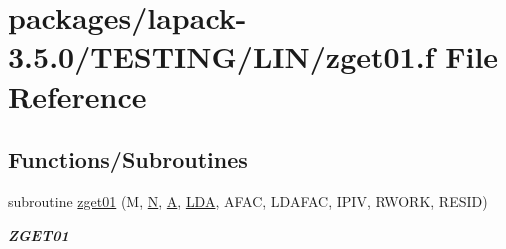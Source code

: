 \hypertarget{zget01_8f}{}\section{packages/lapack-\/3.5.0/\+T\+E\+S\+T\+I\+N\+G/\+L\+I\+N/zget01.f File Reference}
\label{zget01_8f}
\subsection*{Functions/\+Subroutines}
\begin{DoxyCompactItemize}
\item 
subroutine \hyperlink{group__complex16__lin_gaa76ec0bd191997d687577c30f2cc6133}{zget01} (M, \hyperlink{polmisc_8c_a0240ac851181b84ac374872dc5434ee4}{N}, \hyperlink{classA}{A}, \hyperlink{example__user_8c_ae946da542ce0db94dced19b2ecefd1aa}{L\+D\+A}, A\+F\+A\+C, L\+D\+A\+F\+A\+C, I\+P\+I\+V, R\+W\+O\+R\+K, R\+E\+S\+I\+D)
\begin{DoxyCompactList}\small\item\em {\bfseries Z\+G\+E\+T01} \end{DoxyCompactList}\end{DoxyCompactItemize}
